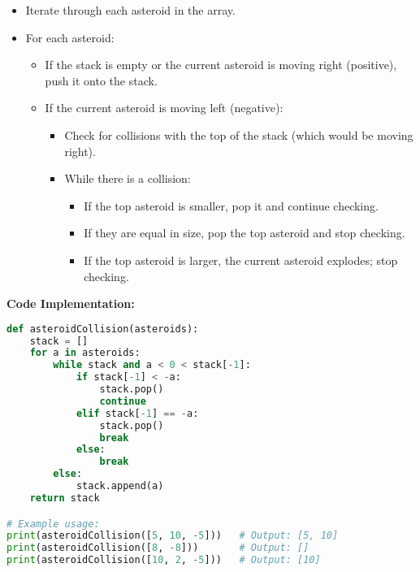 \begin{itemize}
    \item Iterate through each asteroid in the array.
    \item For each asteroid:
        \begin{itemize}
            \item If the stack is empty or the current asteroid is moving right (positive), push it onto the stack.
            \item If the current asteroid is moving left (negative):
                \begin{itemize}
                    \item Check for collisions with the top of the stack (which would be moving right).
                    \item While there is a collision:
                        \begin{itemize}
                            \item If the top asteroid is smaller, pop it and continue checking.
                            \item If they are equal in size, pop the top asteroid and stop checking.
                            \item If the top asteroid is larger, the current asteroid explodes; stop checking.
                        \end{itemize}
                \end{itemize}
        \end{itemize}
\end{itemize}

\textbf{Code Implementation:}

\begin{lstlisting}[language=Python]
def asteroidCollision(asteroids):
    stack = []
    for a in asteroids:
        while stack and a < 0 < stack[-1]:
            if stack[-1] < -a:
                stack.pop()
                continue
            elif stack[-1] == -a:
                stack.pop()
                break
            else:
                break
        else:
            stack.append(a)
    return stack

# Example usage:
print(asteroidCollision([5, 10, -5]))   # Output: [5, 10]
print(asteroidCollision([8, -8]))       # Output: []
print(asteroidCollision([10, 2, -5]))   # Output: [10]
\end{lstlisting}
